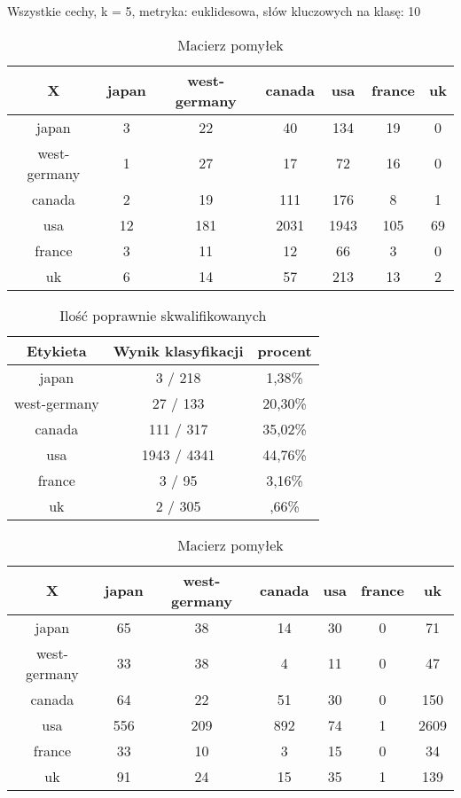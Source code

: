 \documentclass{classrep}
\begin{document}
\newpage
Wszystkie cechy, k = 5, metryka: euklidesowa, słów kluczowych na klasę: 10\newline

\begin{table}[h]
\centering
\begin{tabular}{|c|c|c|c|c|c|c|}
\hline
 X  & japan & west-germany & canada & usa & france & uk\\
\hline
japan & 3 & 22 & 40 & 134 & 19 & 0\\
\hline
west-germany & 1 & 27 & 17 & 72 & 16 & 0\\
\hline
canada & 2 & 19 & 111 & 176 & 8 & 1\\
\hline
usa & 12 & 181 & 2031 & 1943 & 105 & 69\\
\hline
france & 3 & 11 & 12 & 66 & 3 & 0\\
\hline
uk & 6 & 14 & 57 & 213 & 13 & 2\\
\hline
\end{tabular}
\caption{Macierz pomyłek}\end{table}

\begin{table}[h]
\centering
\begin{tabular}{|c|c|c|}
\hline
Etykieta & Wynik klasyfikacji & procent\\
\hline
japan & 3 / 218 & 1,38\%\\
\hline
west-germany & 27 / 133 & 20,30\%\\
\hline
canada & 111 / 317 & 35,02\%\\
\hline
usa & 1943 / 4341 & 44,76\%\\
\hline
france & 3 / 95 & 3,16\%\\
\hline
uk & 2 / 305 & ,66\%\\
\hline
\end{tabular}
\caption{Ilość poprawnie skwalifikowanych}\end{table}





\begin{table}[h]
\centering
\begin{tabular}{|c|c|c|c|c|c|c|}
\hline
 X  & japan & west-germany & canada & usa & france & uk\\
\hline
japan & 65 & 38 & 14 & 30 & 0 & 71\\
\hline
west-germany & 33 & 38 & 4 & 11 & 0 & 47\\
\hline
canada & 64 & 22 & 51 & 30 & 0 & 150\\
\hline
usa & 556 & 209 & 892 & 74 & 1 & 2609\\
\hline
france & 33 & 10 & 3 & 15 & 0 & 34\\
\hline
uk & 91 & 24 & 15 & 35 & 1 & 139\\
\hline
\end{tabular}
\caption{Macierz pomyłek}\end{table}
\end{document}
